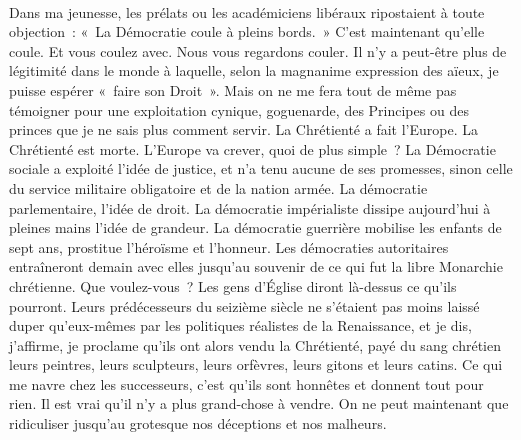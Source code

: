 \documentclass[french,twoside]{book} %
\newcommand{\astertri}{\medskip\par\centerline{\color{rubric}\large\selectfont{\syms ✻\,✻\,✻}}\medskip\par}%
\begin{document}
\astertri

\noindent  \par
Dans ma jeunesse, les prélats ou les académiciens libéraux ripostaient à toute objection : « La Démocratie coule à pleins bords. » C’est maintenant qu’elle coule. Et vous coulez avec. Nous vous regardons couler. Il n’y a peut-être plus de légitimité dans le monde à laquelle, selon la magnanime expression des aïeux, je puisse espérer « faire son Droit ». Mais on ne me fera tout de même pas témoigner pour une exploitation cynique, goguenarde, des Principes ou des princes que je ne sais plus comment servir. La Chrétienté a fait l’Europe. La Chrétienté est morte. L’Europe va crever, quoi de plus simple ? La Démocratie sociale a exploité l’idée de justice, et n’a tenu aucune de ses promesses, sinon celle du service militaire obligatoire et de la nation armée. La démocratie parlementaire, l’idée de droit. La démocratie impérialiste dissipe aujourd’hui à pleines mains l’idée de grandeur. La démocratie guerrière mobilise les enfants de sept ans, prostitue l’héroïsme et l’honneur. Les démocraties autoritaires entraîneront demain avec elles jusqu’au souvenir de ce qui fut la libre Monarchie chrétienne. Que voulez-vous ? Les gens d’Église diront là-dessus ce qu’ils pourront. Leurs prédécesseurs du seizième siècle ne s’étaient pas moins laissé duper qu’eux-mêmes par les politiques réalistes de la Renaissance, et je dis, j’affirme, je proclame qu’ils ont alors vendu la Chrétienté, payé du sang chrétien leurs peintres, leurs sculpteurs, leurs orfèvres, leurs gitons et leurs catins. Ce qui me navre chez les successeurs, c’est qu’ils sont honnêtes et donnent tout pour rien. Il est vrai qu’il n’y a plus grand-chose à vendre. On ne peut maintenant que ridiculiser jusqu’au grotesque nos déceptions et nos malheurs.\par
\end{document}
